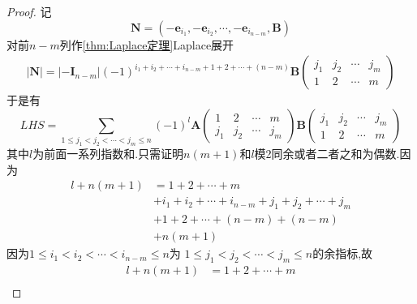 {\begin{proof}
        记\[
            \bm{N}=\left(-\bm{e}_{i_1},-\bm{e}_{i_2},\cdots,-\bm{e}_{i_{n-m}},\bm{B}\right)
        \]
        对前$n-m$列作\cref{thm:Laplace定理}Laplace展开
        \begin{align*}
            \left|\bm{N}\right|=\left|-\bm{I}_{n-m}\right|
            \left(-1\right)^{i_1+i_2+\cdots+i_{n-m}+1+2+\cdots+\left(n-m\right)}\bm{B}\begin{pmatrix}
                                                                                          j_1 & j_2 & \cdots & j_m \\
                                                                                          1   & 2   & \cdots & m
                                                                                      \end{pmatrix}
        \end{align*}
        于是有
        \[
            LHS = \sum_{1\leqslant j_1<j_2<\cdots<j_m\leqslant n}
            \left(-1\right)^l\bm{A}\begin{pmatrix}
                1   & 2   & \cdots & m   \\
                j_1 & j_2 & \cdots & j_m
            \end{pmatrix}\bm{B}\begin{pmatrix}
                j_1 & j_2 & \cdots & j_m \\
                1   & 2   & \cdots & m
            \end{pmatrix}
        \]
        其中$l$为前面一系列指数和.只需证明$n\left(m+1\right)$和$l$模2同余或者二者之和为偶数.因为
        \begin{align*}
            l+n\left(m+1\right) & =
            1+2+\cdots+m                                                        \\
                                & +i_1+i_2+\cdots+i_{n-m}+j_1+j_2+\cdots+j_m    \\
                                & +1+2+\cdots+\left(n-m\right)+\left(n-m\right)
            \\
                                & +n\left(m+1\right)
        \end{align*}
        因为$1\leqslant i_1
            <i_2<\cdots<i_{n-m}
            \leqslant n$为
        $1\leqslant j_1
            <j_2<\cdots<j_m
            \leqslant n$的余指标,故
        \begin{align*}
            l+n\left(m+1\right) & =
            1+2+\cdots+m                                                                                                   \\

\end{align*}
\end{proof}}
